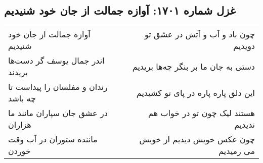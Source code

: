 \begin{center}
\section*{غزل شماره ۱۷۰۱: آوازه جمالت از جان خود شنیدیم}
\label{sec:1701}
\begin{longtable}{l p{0.5cm} r}
آوازه جمالت از جان خود شنیدیم
&&
چون باد و آب و آتش در عشق تو دویدیم
\\
اندر جمال یوسف گر دست‌ها بریدند
&&
دستی به جان ما بر بنگر چه‌ها بریدیم
\\
رندان و مفلسان را پیداست تا چه باشد
&&
این دلق پاره پاره در پای تو کشیدیم
\\
در عشق جان سپاران مانند ما هزاران
&&
هستند لیک چون تو در خواب هم ندیدیم
\\
ماننده ستوران در آب وقت خوردن
&&
چون عکس خویش دیدیم از خویش می رمیدیم
\\
\end{longtable}
\end{center}
